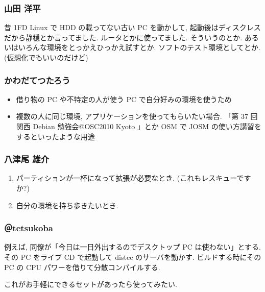 \documentclass[cjk,dvipdfmx,12pt,%
hyperref={bookmarks=true,bookmarksnumbered=true,bookmarksopen=false,%
colorlinks=false,%
pdftitle={第40回 関西Debian勉強会},%
pdfauthor={倉敷・のがた・佐々木},%
pdfsubject={資料},%
}]{beamer}
\begin{document}
\begin{frame}[fragile]
\frametitle{ 山田 洋平 }


昔 1FD Linux で HDD の載ってない古い PC を動かして, 起動後はディスクレスだから静穏とか言ってました. ルータとかに使ってました. そういうのとか.
あるいはいろんな環境をとっかえひっかえ試すとか. ソフトのテスト環境としてとか. (仮想化でもいいのだけど)


\end{frame}



\begin{frame}[fragile]
\frametitle{ かわだてつたろう }


    \begin{itemize}
          \item 借り物の PC や不特定の人が使う PC で自分好みの環境を使うため
          \item 複数の人に同じ環境, アプリケーションを使ってもらいたい場合.
        「第 37 回関西 Debian 勉強会@OSC2010 Kyoto 」とか OSM で JOSM の使い方講習をするといったような用途
    \end{itemize}



\end{frame}



\begin{frame}[fragile]
\frametitle{ 八津尾  雄介 }

    \begin{enumerate}
          \item パーティションが一杯になって拡張が必要なとき.
        (これもレスキューですか?)
          \item 自分の環境を持ち歩きたいとき.
    \end{enumerate}


\end{frame}



\begin{frame}[fragile]
\frametitle{＠tetsu\textunderscore{}koba }


例えば, 同僚が「今日は一日外出するのでデスクトップ PC は使わない」とする.
その PC をライブ CD で起動して distcc のサーバを動かす.
ビルドする時にその PC の CPU パワーを借りて分散コンパイルする.

これがお手軽にできるセットがあったら使ってみたい.


\end{frame}
\end{document}
